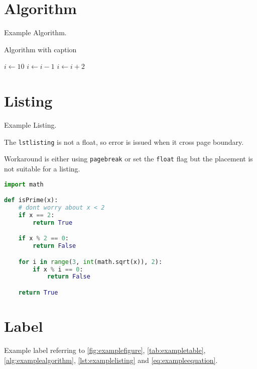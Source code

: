 \section{Algorithm}

Example Algorithm.

\begin{algorithm}
  \centering
  \caption{Algorithm with caption}
  \label{alg:examplealgorithm}
  \begin{algorithmic}
  \State $i \gets 10$
    \State $i \gets i-1$
  \Else
      \State $i \gets i+2$
    \EndIf
  \EndIf
  \end{algorithmic}
\end{algorithm}


\pagebreak

\section{Listing}

Example Listing.

The \texttt{lstlisting} is not a float,
so error is issued when it cross page boundary.

Workaround is either using \texttt{pagebreak} or
set the \texttt{float} flag but the placement is not suitable for a listing.

\begin{lstlisting}[language=Python, caption=Example Listing, label={lst:examplelisting}]
import math

def isPrime(x):
    # dont worry about x < 2
    if x == 2:
        return True

    if x % 2 == 0:
        return False

    for i in range(3, int(math.sqrt(x)), 2):
        if x % i == 0:
            return False

    return True
\end{lstlisting}

\section{Label}

Example label referring to \autoref{fig:examplefigure}, \autoref{tab:exampletable},
\autoref{alg:examplealgorithm}, \autoref{lst:examplelisting} and \autoref{eq:exampleequation}.

